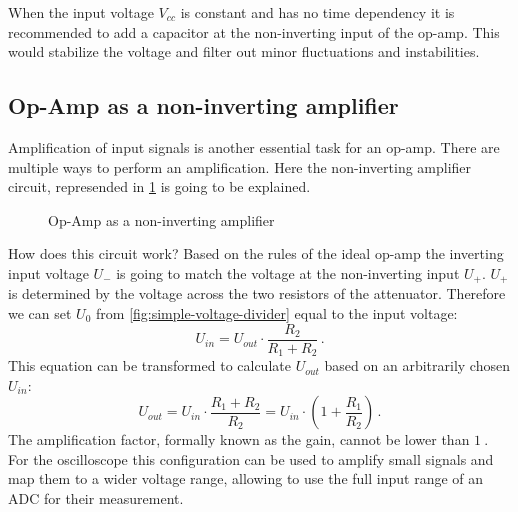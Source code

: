 When the input voltage $V_{cc}$ is constant and has no time dependency it is recommended to add a capacitor at the non-inverting input of the op-amp. This would stabilize the voltage and filter out minor fluctuations and instabilities.

\subsection{Op-Amp as a non-inverting amplifier}

Amplification of input signals is another essential task for an op-amp. There are multiple ways to perform an amplification. Here the non-inverting amplifier circuit, represended in \cref{fig:non_inverting_amplifier} is going to be explained.

\begin{figure}[htb]
	\centering
	\caption{Op-Amp as a non-inverting amplifier}
	\label{fig:non_inverting_amplifier}
\end{figure}

How does this circuit work? Based on the rules of the ideal op-amp the inverting input voltage $U_-$ is going to match the voltage at the non-inverting input $U_+$. $U_+$ is determined by the voltage across the two resistors of the attenuator. Therefore we can set $U_0$ from \cref{fig:simple-voltage-divider} equal to the input voltage:
\begin{equation}
	U_{in} = U_{out} \cdot \frac{R_2}{R_1 + R_2}\,.
\end{equation}
This equation can be transformed to calculate $U_{out}$ based on an arbitrarily chosen $U_{in}$:
\begin{equation}
	U_{out} = U_{in} \cdot \frac{R_1 + R_2}{R_2} = U_{in} \cdot \left( 1 + \frac{R_1}{R_2} \right)\,.
\end{equation}
The amplification factor, formally known as the \glqq{}gain\grqq{}, cannot be lower than $\SI{1}{}$. For the oscilloscope this configuration can be used to amplify small signals and map them to a wider voltage range, allowing to use the full input range of an ADC for their measurement.

